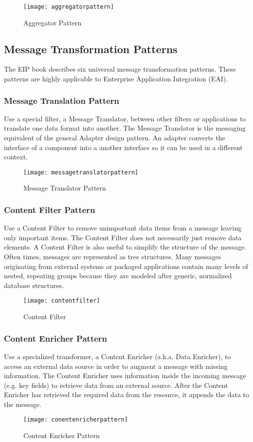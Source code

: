 \begin{figure}[H]
  \center
  \texttt{[image: aggregatorpattern]}
  \caption{Aggregator Pattern}
\end{figure}

\pagebreak

\subsection{Message Transformation Patterns}
The EIP book describes six universal message transformation patterns. These patterns are highly applicable to Enterprise Application Integration (EAI).

\subsubsection{Message Translation Pattern}
Use a special filter, a Message Translator, between other filters or applications to translate one data format into another. The Message Translator is the messaging equivalent of the general Adapter design pattern. An adapter converts the interface of a component into a another interface so it can be used in a different context.

\begin{figure}[H]
  \center
  \texttt{[image: messagetranslatorpattern]}
  \caption{Message Translator Pattern}
\end{figure}

\subsubsection{Content Filter Pattern}
Use a Content Filter to remove unimportant data items from a message leaving only important items. The Content Filter does not necessarily just remove data elements. A Content Filter is also useful to simplify the structure of the message. Often times, messages are represented as tree structures. Many messages originating from external systems or packaged applications contain many levels of nested, repeating groups because they are modeled after generic, normalized database structures.

\begin{figure}[H]
  \center
  \texttt{[image: contentfilter]}
  \caption{Content Filter}
\end{figure}

\subsubsection{Content Enricher Pattern}
Use a specialized transformer, a Content Enricher (a.k.a. Data Enricher), to access an external data source in order to augment a message with missing information. The Content Enricher uses information inside the incoming message (e.g. key fields) to retrieve data from an external source. After the Content Enricher has retrieved the required data from the resource, it appends the data to the message.

\begin{figure}[H]
  \center
  \texttt{[image: conentenricherpattern]}
  \caption{Content Enricher Pattern}
\end{figure}

